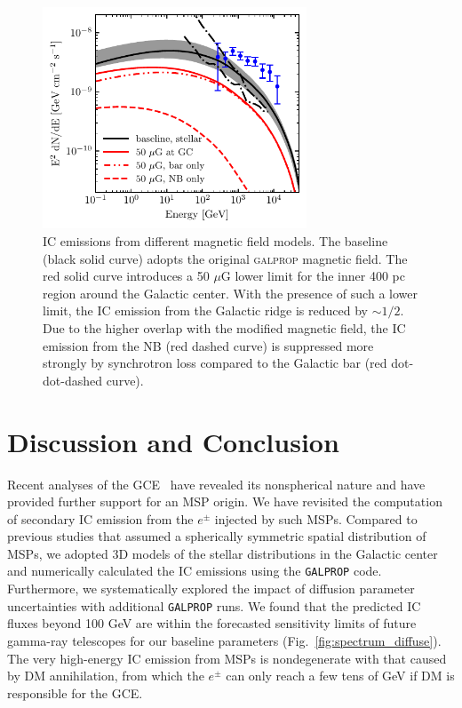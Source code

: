 \documentclass[doublespace,nopageskip]{VTthesis} %
\begin{document}
\begin{figure}[htb]
    \centering
    \includegraphics[width=0.7\textwidth]{Figures/IC_MSPs/ics_spectrum_bfields.pdf}
    \caption{IC emissions from different magnetic field models. The baseline (black solid curve) adopts the original \textsc{galprop} magnetic field. The red solid curve introduces a 50 $\mu$G lower limit for the inner 400 pc region around the Galactic center. With the presence of such a lower limit, the IC emission from the Galactic ridge is reduced by $\sim 1/2$. Due to the higher overlap with the modified magnetic field, the IC emission from the NB (red dashed curve) is suppressed more strongly by synchrotron loss compared to the Galactic bar (red dot-dot-dashed curve).}
    \label{fig:spectrum_bfields}
\end{figure}

\section{\label{sec:conclu}Discussion and Conclusion}

Recent analyses of the GCE~\cite{2018NatAs...2..387M,2018NatAs...2..819B,2019JCAP...09..042M} have revealed its nonspherical nature and have provided further support for an MSP origin. We have revisited the computation of secondary IC emission from the $e^\pm$ injected by such MSPs. Compared to previous studies that assumed a spherically symmetric spatial distribution of MSPs, we adopted 3D models of the stellar distributions in the Galactic center and numerically calculated the IC emissions using the {\tt GALPROP} code. Furthermore, we systematically explored the impact of diffusion parameter uncertainties with additional {\tt GALPROP} runs. We found that the predicted IC fluxes beyond 100 GeV are within the forecasted sensitivity limits of future gamma-ray telescopes for our baseline parameters (Fig.~\ref{fig:spectrum_diffuse}). The very high-energy IC emission from MSPs is nondegenerate with that caused by DM annihilation, from which the $e^\pm$ can only reach a few tens of GeV if DM is responsible for the GCE.
\end{document}
